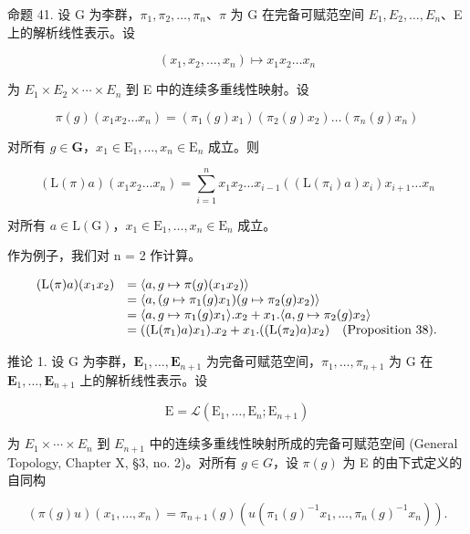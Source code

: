 命题 41. 设 G 为李群，\(\pi_1, \pi_2, \ldots, \pi_n\)、\(\pi\) 为 G 在完备可赋范空间 \(E_1, E_2, \ldots, E_n\)、E 上的解析线性表示。设

\[
\left(x _ {1}, x _ {2}, \dots , x _ {n}\right) \mapsto x _ {1} x _ {2} \dots x _ {n}
\]

为 \(E_{1} \times E_{2} \times \cdots \times E_{n}\) 到 E 中的连续多重线性映射。设

\[
\pi (g) \left(x _ {1} x _ {2} \dots x _ {n}\right) = \left(\pi_ {1} (g) x _ {1}\right) \left(\pi_ {2} (g) x _ {2}\right) \dots \left(\pi_ {n} (g) x _ {n}\right)
\]

对所有 \(g \in \mathbf{G}\)，\(x_{1} \in \mathrm{E}_{1}, \ldots, x_{n} \in \mathrm{E}_{n}\) 成立。则

\[
(\mathrm{L} (\pi) a) (x _ {1} x _ {2} \dots x _ {n}) = \sum_ {i = 1} ^ {n} x _ {1} x _ {2} \dots x _ {i - 1} ((\mathrm{L} (\pi_ {i}) a) x _ {i}) x _ {i + 1} \dots x _ {n}
\]

对所有 \(a \in \mathrm{L}(\mathrm{G})\)，\(x_1 \in \mathrm{E}_1, \ldots, x_n \in \mathrm{E}_n\) 成立。

作为例子，我们对 n = 2 作计算。

\[
\begin{array}{l l} (\mathrm{L} (\pi) a) (x _ {1} x _ {2}) & = \langle a, g \mapsto \pi (g) (x _ {1} x _ {2}) \rangle \\ & = \langle a, (g \mapsto \pi_ {1} (g) x _ {1}) (g \mapsto \pi_ {2} (g) x _ {2}) \rangle \\ & = \langle a, g \mapsto \pi_ {1} (g) x _ {1} \rangle . x _ {2} + x _ {1}. \langle a, g \mapsto \pi_ {2} (g) x _ {2} \rangle \\ & = ((\mathrm{L} (\pi_ {1}) a) x _ {1}). x _ {2} + x _ {1}. ((\mathrm{L} (\pi_ {2}) a) x _ {2}) \quad \text {(Proposition 38).} \end{array}
\]

推论 1. 设 G 为李群，\(\mathbf{E}_1,\ldots ,\mathbf{E}_{n + 1}\) 为完备可赋范空间，\(\pi_1,\dots ,\pi_{n + 1}\) 为 G 在 \(\mathbf{E}_1,\dots ,\mathbf{E}_{n + 1}\) 上的解析线性表示。设

\[
\mathrm{E} = \mathscr {L} (\mathrm{E} _ {1}, \dots , \mathrm{E} _ {n}; \mathrm{E} _ {n + 1})
\]

为 \(E_{1} \times \cdots \times E_{n}\) 到 \(E_{n+1}\) 中的连续多重线性映射所成的完备可赋范空间 (General Topology, Chapter X, §3, no. 2)。对所有 \(g \in G\)，设 \(\pi(g)\) 为 E 的由下式定义的自同构

\[
(\pi (g) u) (x _ {1}, \dots , x _ {n}) = \pi_ {n + 1} (g) (u (\pi_ {1} (g) ^ {- 1} x _ {1}, \dots , \pi_ {n} (g) ^ {- 1} x _ {n})).
\]

